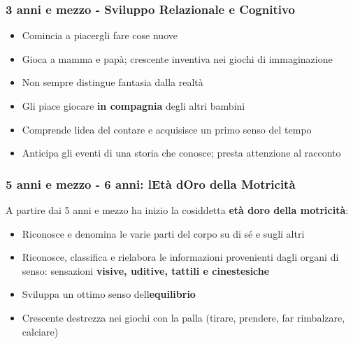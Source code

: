 \documentclass[a4paper,11pt]{article}
\providecommand{\tightlist}{%
  \setlength{\itemsep}{0pt}\setlength{\parskip}{0pt}}
\begin{document}
\subsubsection{3 anni e mezzo - Sviluppo Relazionale e
      Cognitivo}\label{anni-e-mezzo---sviluppo-relazionale-e-cognitivo}

\begin{itemize}
      \tightlist
      \item
            Comincia a piacergli fare cose nuove
      \item
            Gioca a mamma e papà; crescente inventiva nei giochi di immaginazione
      \item
            Non sempre distingue fantasia dalla realtà
      \item
            Gli piace giocare \textbf{in compagnia} degli altri bambini
      \item
            Comprende l\textquotesingle idea del contare e acquisisce un primo
            senso del tempo
      \item
            Anticipa gli eventi di una storia che conosce; presta attenzione al
            racconto
\end{itemize}

\subsubsection{5 anni e mezzo - 6 anni: l\textquotesingle Età
      d\textquotesingle Oro della
      Motricità}\label{anni-e-mezzo---6-anni-letuxe0-doro-della-motricituxe0}

A partire dai 5 anni e mezzo ha inizio la cosiddetta \textbf{età
      d\textquotesingle oro della motricità}:

\begin{itemize}
      \tightlist
      \item
            Riconosce e denomina le varie parti del corpo su di sé e sugli altri
      \item
            Riconosce, classifica e rielabora le informazioni provenienti dagli
            organi di senso: sensazioni \textbf{visive, uditive, tattili e
                  cinestesiche}
      \item
            Sviluppa un ottimo senso dell\textquotesingle{}\textbf{equilibrio}
      \item
            Crescente destrezza nei giochi con la palla (tirare, prendere, far
            rimbalzare, calciare)
\end{itemize}
\end{document}
